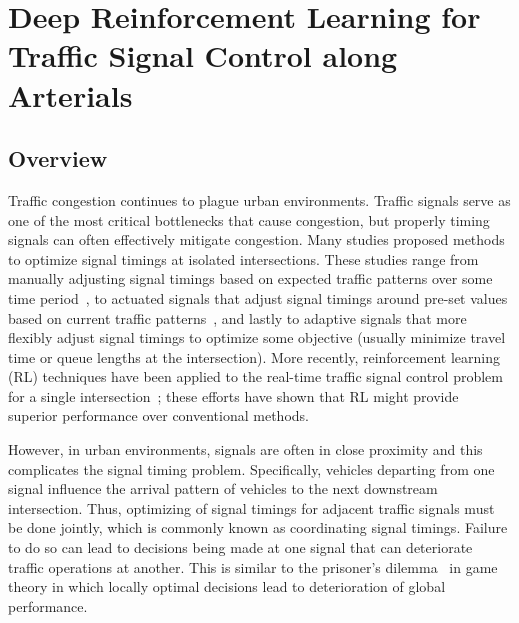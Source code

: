 \chapter{Deep Reinforcement Learning for Traffic Signal Control along Arterials}
\label{chap:arterial}

\section{Overview}
\label{sec:intro}
Traffic congestion continues to plague urban environments. Traffic signals serve as one of the most critical bottlenecks that cause congestion, but properly timing signals can often effectively mitigate congestion. Many studies proposed methods to optimize signal timings at isolated intersections. These studies range from manually adjusting signal timings based on expected traffic patterns over some time period~\cite{Mill63}, to actuated signals that adjust signal timings around pre-set values based on current traffic patterns~\cite{CoGD13}, and lastly to adaptive signals that more flexibly adjust signal timings to optimize some objective (usually minimize travel time or queue lengths at the intersection). More recently, reinforcement learning (RL) techniques have been applied to the real-time traffic signal control problem for a single intersection~\cite{VaOl16,wei2018intellilight}; these efforts have shown that RL might provide superior performance over conventional methods. 

However, in urban environments, signals are often in close proximity and this complicates the signal timing problem. Specifically, vehicles departing from one signal influence the arrival pattern of vehicles to the next downstream intersection. Thus, optimizing of signal timings for adjacent traffic signals must be done jointly, which is commonly known as coordinating signal timings. Failure to do so can lead to decisions being made at one signal that can deteriorate traffic operations at another. This is similar to the prisoner's dilemma~\cite{poundstone1993prisoner} in game theory in which locally optimal decisions lead to deterioration of global performance. 

